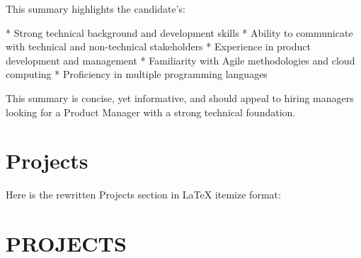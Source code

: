 \documentclass[11pt]{article}
\begin{document}
This summary highlights the candidate's:

* Strong technical background and development skills
* Ability to communicate with technical and non-technical stakeholders
* Experience in product development and management
* Familiarity with Agile methodologies and cloud computing
* Proficiency in multiple programming languages

This summary is concise, yet informative, and should appeal to hiring managers looking for a Product Manager with a strong technical foundation.

\section*{Projects}
Here is the rewritten Projects section in LaTeX itemize format:

\section*{PROJECTS}
\end{document}
